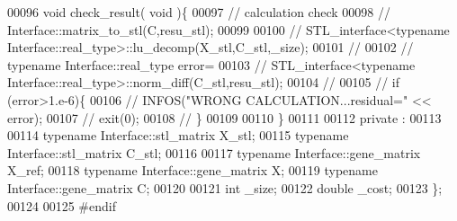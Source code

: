 \begin{DoxyCode}
00096   \textcolor{keywordtype}{void} check\_result( \textcolor{keywordtype}{void} )\{
00097     \textcolor{comment}{// calculation check}
00098 \textcolor{comment}{//     Interface::matrix\_to\_stl(C,resu\_stl);}
00099 
00100 \textcolor{comment}{//     STL\_interface<typename Interface::real\_type>::lu\_decomp(X\_stl,C\_stl,\_size);}
00101 \textcolor{comment}{//}
00102 \textcolor{comment}{//     typename Interface::real\_type error=}
00103 \textcolor{comment}{//       STL\_interface<typename Interface::real\_type>::norm\_diff(C\_stl,resu\_stl);}
00104 \textcolor{comment}{//}
00105 \textcolor{comment}{//     if (error>1.e-6)\{}
00106 \textcolor{comment}{//       INFOS("WRONG CALCULATION...residual=" << error);}
00107 \textcolor{comment}{//       exit(0);}
00108 \textcolor{comment}{//     \}}
00109 
00110   \}
00111 
00112 private :
00113 
00114   \textcolor{keyword}{typename} Interface::stl\_matrix X\_stl;
00115   \textcolor{keyword}{typename} Interface::stl\_matrix C\_stl;
00116 
00117   \textcolor{keyword}{typename} Interface::gene\_matrix X\_ref;
00118   \textcolor{keyword}{typename} Interface::gene\_matrix X;
00119   \textcolor{keyword}{typename} Interface::gene\_matrix C;
00120 
00121   \textcolor{keywordtype}{int} \_size;
00122   \textcolor{keywordtype}{double} \_cost;
00123 \};
00124 
00125 \textcolor{preprocessor}{#endif}
\end{DoxyCode}
